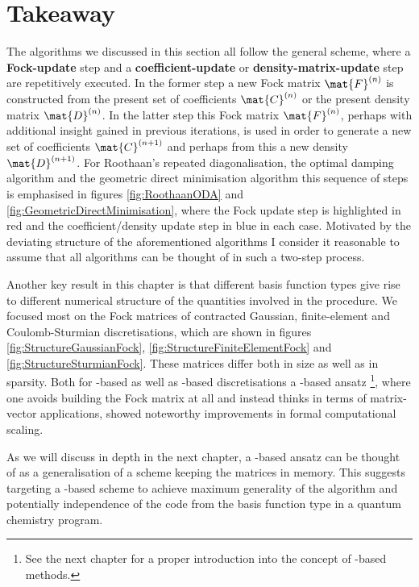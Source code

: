\section{Takeaway}
\label{sec:SCFtakeaway}
The \SCF algorithms we discussed in this section all follow the general scheme,
where a \textbf{Fock-update} step and
a \textbf{coefficient-update} or \textbf{density-matrix-update}
step are repetitively executed.
In the former step a new Fock matrix $\mat{F}^{(n)}$ is constructed from
the present set of \SCF coefficients $\mat{C}^{(n)}$
or the present density matrix $\mat{D}^{(n)}$.
In the latter step this Fock matrix $\mat{F}^{(n)}$,
perhaps with additional insight gained in previous iterations,
is used in order to generate a new set of coefficients $\mat{C}^{(n+1)}$
and perhaps from this a new density $\mat{D}^{(n+1)}$.
For Roothaan's repeated diagonalisation,
the optimal damping algorithm and the geometric direct minimisation algorithm
this sequence of steps is emphasised in figures
\vref{fig:RoothaanODA} and \vref{fig:GeometricDirectMinimisation},
where the Fock update step is highlighted in red
and the coefficient/density update step in blue in each case.
Motivated by the deviating structure of the aforementioned
algorithms I consider it reasonable
to assume that all \SCF algorithms can be thought of in such
a two-step process.

Another key result in this chapter is
that different basis function types give rise to
different numerical structure
of the quantities involved in the \SCF procedure.
We focused most on the Fock matrices
of contracted Gaussian, finite-element and Coulomb-Sturmian discretisations,
which are shown in figures
\vref{fig:StructureGaussianFock},
\vref{fig:StructureFiniteElementFock}
and \vref{fig:StructureSturmianFock}.
These matrices differ both in size as well as in sparsity.
Both for \FE-based as well as \CS-based
discretisations a \contraction-based ansatz%
\footnote{See the next chapter for a proper introduction into the concept
of \contraction-based methods.},
where one avoids building the Fock matrix at all
and instead thinks in terms of matrix-vector applications,
showed noteworthy improvements in formal computational scaling.

As we will discuss in depth in the next chapter,
a \contraction-based ansatz can be thought of as a generalisation
of a scheme keeping the matrices in memory.
This suggests targeting a \contraction-based \SCF scheme to achieve
maximum generality of the \SCF algorithm
and potentially independence of the \SCF code from
the basis function type in a quantum chemistry program.

